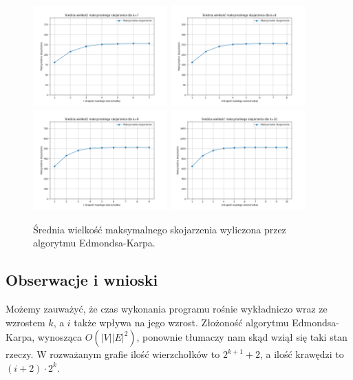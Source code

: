 \documentclass{article}
\begin{document}
\begin{figure}[H]
\includegraphics[width=0.46\textwidth]{maximumBipartiteMatchingMaxMatchingPlot7.png}
\includegraphics[width=0.46\textwidth]{maximumBipartiteMatchingMaxMatchingPlot8.png}
\includegraphics[width=0.46\textwidth]{maximumBipartiteMatchingMaxMatchingPlot9.png}
\includegraphics[width=0.46\textwidth]{maximumBipartiteMatchingMaxMatchingPlot10.png}
\caption{Średnia wielkość maksymalnego skojarzenia wyliczona przez algorytmu Edmondsa-Karpa.}
\end{figure}

\subsection{Obserwacje i wnioski}
Możemy zauważyć, że czas wykonania programu rośnie wykładniczo wraz ze wzrostem $k$, a $i$ także wpływa na jego wzrost.
Złożoność algorytmu Edmondsa-Karpa, wynosząca $O(|V||E|^2)$, ponownie tłumaczy nam skąd wziął się taki stan rzeczy.
W rozważanym grafie ilość wierzchołków to $2^{k + 1} + 2$, a ilość krawędzi to $(i + 2) \cdot 2^k$.\\
\end{document}
